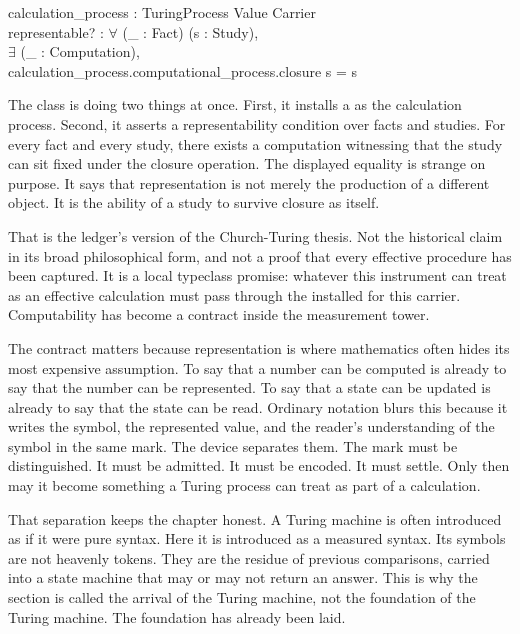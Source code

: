 \begin{leancode}
calculation\_process : TuringProcess Value Carrier\\
representable? : \(\forall\) (\_ : Fact) (s : Study),\\
\quad \(\exists\) (\_ : Computation),\\
\quad calculation\_process.computational\_process.closure s = s
\end{leancode}

The class is doing two things at once. First, it installs a
 as the calculation process. Second, it asserts a
representability condition over facts and studies. For every fact and every
study, there exists a computation witnessing that the study can sit fixed under
the closure operation. The displayed equality is strange on purpose. It says
that representation is not merely the production of a different object. It is
the ability of a study to survive closure as itself.

That is the ledger's version of the Church-Turing thesis. Not the historical
claim in its broad philosophical form, and not a proof that every effective
procedure has been captured. It is a local typeclass promise: whatever this
instrument can treat as an effective calculation must pass through the
 installed for this carrier. Computability has become a
contract inside the measurement tower.

The contract matters because representation is where mathematics often hides
its most expensive assumption. To say that a number can be computed is already
to say that the number can be represented. To say that a state can be updated
is already to say that the state can be read. Ordinary notation blurs this
because it writes the symbol, the represented value, and the reader's
understanding of the symbol in the same mark. The device separates them. The
mark must be distinguished. It must be admitted. It must be encoded. It must
settle. Only then may it become something a Turing process can treat as part
of a calculation.

That separation keeps the chapter honest. A Turing machine is often introduced
as if it were pure syntax. Here it is introduced as a measured syntax. Its
symbols are not heavenly tokens. They are the residue of previous
comparisons, carried into a state machine that may or may not return an
answer. This is why the section is called the arrival of the Turing machine,
not the foundation of the Turing machine. The foundation has already been
laid.


